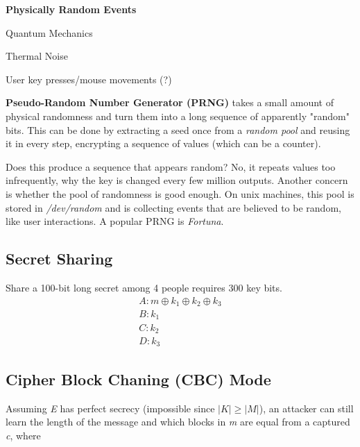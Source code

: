 \documentclass[12pt]{article}
\begin{document}
\textbf{Physically Random Events}\begin{list}{*}{
\setlength{\itemsep}{0pt}
\setlength{\parsep}{0pt}
\setlength{\topsep}{0pt}
\setlength{\partopsep}{0pt}
\setlength{\leftmargin}{2em}
\setlength{\labelwidth}{1.5em}
\setlength{\labelsep}{0.5em}
}
\item Quantum Mechanics
\item Thermal Noise
\item User key presses/mouse movements (?)
\end{list}

\textbf{Pseudo-Random Number Generator (PRNG)} takes a small amount of physical randomness and turn them into a long sequence of apparently "random" bits. This can be done by extracting a seed once from a \emph{random pool} and reusing it in every step, encrypting a sequence of values (which can be a counter).

Does this produce a sequence that appears random? No, it repeats values too infrequently, why the key is changed every few million outputs. Another concern is whether the pool of randomness is good enough. On unix machines, this pool is stored in \emph{/dev/random} and is collecting events that are believed to be random, like user interactions. A popular PRNG is \emph{Fortuna}.

\subsection{Secret Sharing}

Share a 100-bit long secret among 4 people requires 300 key bits.
\begin{equation}
\begin{split}
A: m \oplus k_1 \oplus k_2 \oplus k_3 \\
B: k_1 \\
C: k_2 \\
D: k_3
\end{split}
\end{equation}
 
\subsection*{Cipher Block Chaning (CBC) Mode}

Assuming \emph{E} has perfect secrecy (impossible since $|K| \ge |M|$), an attacker can still learn the length of the message and which blocks in \emph{m} are equal from a captured \emph{c}, where
\end{document}
